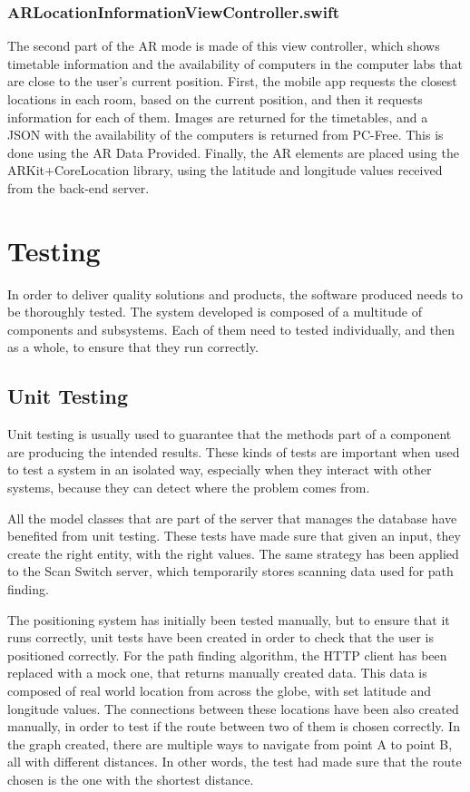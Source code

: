 \subsubsection*{ARLocationInformationViewController.swift}
The second part of the AR mode is made of this view controller, which shows timetable information and the availability of computers in the computer labs that are close to the user's current position. First, the mobile app requests the closest locations in each room, based on the current position, and then it requests information for each of them. Images are returned for the timetables, and a JSON with the availability of the computers is returned from PC-Free. This is done using the AR Data Provided. Finally, the AR elements are placed using the ARKit+CoreLocation library, using the latitude and longitude values received from the back-end server.

\section{Testing}
In order to deliver quality solutions and products, the software produced needs to be thoroughly tested. The system developed is composed of a multitude of components and subsystems. Each of them need to tested individually, and then as a whole, to ensure that they run correctly.

\subsection{Unit Testing}
Unit testing is usually used to guarantee that the methods part of a component are producing the intended results. These kinds of tests are important when used to test a system in an isolated way, especially when they interact with other systems, because they can detect where the problem comes from. 

All the model classes that are part of the server that manages the database have benefited from unit testing. These tests have made sure that given an input, they create the right entity, with the right values. The same strategy has been applied to the Scan Switch server, which temporarily stores scanning data used for path finding. 

The positioning system has initially been tested manually, but to ensure that it runs correctly, unit tests have been created in order to check that the user is positioned correctly. For the path finding algorithm, the HTTP client has been replaced with a mock one, that returns manually created data. This data is composed of real world location from across the globe, with set latitude and longitude values. The connections between these locations have been also created manually, in order to test if the route between two of them is chosen correctly. In the graph created, there are multiple ways to navigate from point A to point B, all with different distances. In other words, the test had made sure that the route chosen is the one with the shortest distance.

